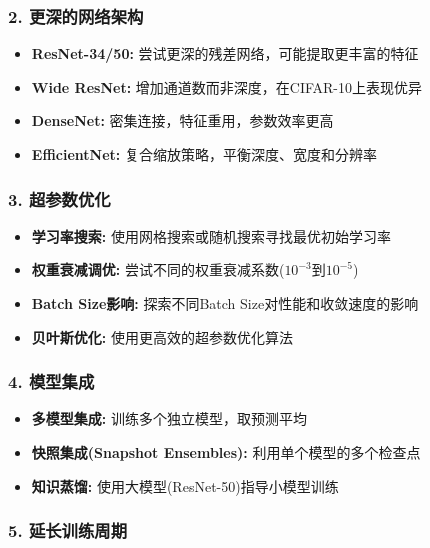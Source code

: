\documentclass[12pt,a4paper]{article}
\begin{document}
\subsubsection{2. 更深的网络架构}

\begin{itemize}[leftmargin=2em]
    \item \textbf{ResNet-34/50:} 尝试更深的残差网络，可能提取更丰富的特征
    \item \textbf{Wide ResNet:} 增加通道数而非深度，在CIFAR-10上表现优异
    \item \textbf{DenseNet:} 密集连接，特征重用，参数效率更高
    \item \textbf{EfficientNet:} 复合缩放策略，平衡深度、宽度和分辨率
\end{itemize}

\subsubsection{3. 超参数优化}

\begin{itemize}[leftmargin=2em]
    \item \textbf{学习率搜索:} 使用网格搜索或随机搜索寻找最优初始学习率
    \item \textbf{权重衰减调优:} 尝试不同的权重衰减系数($10^{-3}$到$10^{-5}$)
    \item \textbf{Batch Size影响:} 探索不同Batch Size对性能和收敛速度的影响
    \item \textbf{贝叶斯优化:} 使用更高效的超参数优化算法
\end{itemize}

\subsubsection{4. 模型集成}

\begin{itemize}[leftmargin=2em]
    \item \textbf{多模型集成:} 训练多个独立模型，取预测平均
    \item \textbf{快照集成(Snapshot Ensembles):} 利用单个模型的多个检查点
    \item \textbf{知识蒸馏:} 使用大模型(ResNet-50)指导小模型训练
\end{itemize}

\subsubsection{5. 延长训练周期}
\end{document}
